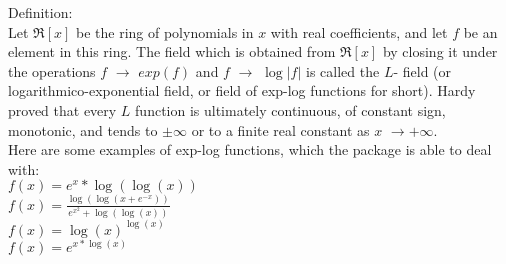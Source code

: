 {Definition: \\
Let $\Re[x]$ be the ring of polynomials in $x$ with real coefficients, and let $f$ be an element in this ring. The field which is obtained from $\Re[x]$ by closing it under the operations $f$ $\rightarrow$ $exp(f)$ and $f$ $\rightarrow$ $\log |f|$ is called the $L$- field (or logarithmico-exponential field, or field of exp-log functions for short).
\newline 
\newline
Hardy proved that every $L$ function is ultimately continuous, of constant sign, monotonic, and tends to $\pm \infty$ or to a finite real constant as $x$ $\rightarrow +\infty.$ \\

Here are some examples of exp-log functions, which the package is able to deal with: \\

$ f(x)=e^{x}*\log(\log(x))$ \\

$ f(x)=\frac{\log(\log(x+e^{-x}))}{e^{x^{2}}+\log(\log(x))} $ \\

$ f(x)=\log(x)^{\log(x)} $ \\

$ f(x)=e^{x*\log(x)} $ \\

\pagebreak
}
